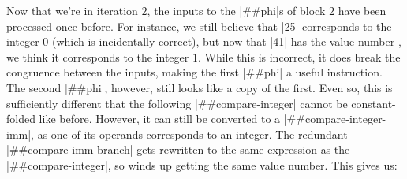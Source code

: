 Now that we're in iteration $2$, the inputs to the \factor|##phi|s of block $2$
have been processed once before.  For instance, we still believe that
\factor|25| corresponds to the integer $0$ (which is incidentally correct), but
now that \factor|41| has the value number , we think it corresponds to
the integer $1$.  While this is incorrect, it does break the congruence between
the inputs, making the first \factor|##phi| a useful instruction.  The second
\factor|##phi|, however, still looks like a copy of the first.  Even so, this
is sufficiently different that the following \factor|##compare-integer| cannot
be constant-folded like before.  However, it can still be converted to a
\factor|##compare-integer-imm|, as one of its operands corresponds to an
integer.  The redundant \factor|##compare-imm-branch| gets rewritten to the
same expression as the \factor|##compare-integer|, so winds up getting the same
value number.  This gives us:
%
